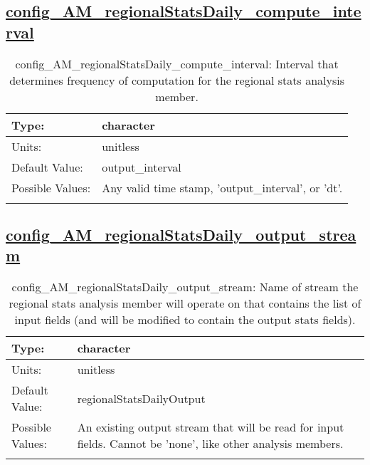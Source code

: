 \subsection[config\_AM\_regionalStatsDaily\_compute\_interval]{\hyperref[sec:nm_tab_AM_regionalStatsDaily]{config\_AM\_regionalStatsDaily\_compute\_interval}}
\label{subsec:nm_sec_config_AM_regionalStatsDaily_compute_interval}
\begin{center}
\begin{longtable}{| p{2.0in} || p{4.0in} |}
    \hline
    Type: & character \\
    \hline
    Units: & \si{unitless} \\
    \hline
    Default Value: & output\_interval \\
    \hline
    Possible Values: & Any valid time stamp, 'output\_interval', or 'dt'. \\
    \hline
    \caption{config\_AM\_regionalStatsDaily\_compute\_interval: Interval that determines frequency of computation for the regional stats analysis member.}
\end{longtable}
\end{center}
\subsection[config\_AM\_regionalStatsDaily\_output\_stream]{\hyperref[sec:nm_tab_AM_regionalStatsDaily]{config\_AM\_regionalStatsDaily\_output\_stream}}
\label{subsec:nm_sec_config_AM_regionalStatsDaily_output_stream}
\begin{center}
\begin{longtable}{| p{2.0in} || p{4.0in} |}
    \hline
    Type: & character \\
    \hline
    Units: & \si{unitless} \\
    \hline
    Default Value: & regionalStatsDailyOutput \\
    \hline
    Possible Values: & An existing output stream that will be read for input fields. Cannot be 'none', like other analysis members. \\
    \hline
    \caption{config\_AM\_regionalStatsDaily\_output\_stream: Name of stream the regional stats analysis member will operate on that contains the list of input fields (and will be modified to contain the output stats fields).}
\end{longtable}
\end{center}
